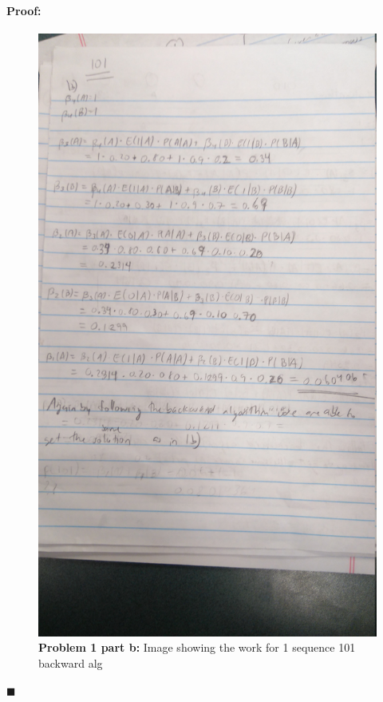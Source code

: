 \documentclass[12pt]{article}
\newenvironment{proof}{\paragraph{Proof: }}{\hfill$\blacksquare$}
\begin{document}
\begin{proof}
\newpage
\begin{figure}[!htbp]
\centering
\includegraphics[width = 13cm]{hw6_1b_2.jpg}
\caption{\textbf{Problem 1 part b:} Image showing the work for 1 sequence 101 backward alg}
\end{figure}

\newpage


\end{proof}
\end{document}
